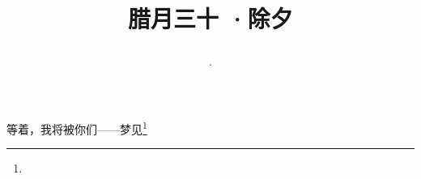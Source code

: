 \title{\date[d=9,m=2,y=2024][year:cn-y,年,month:cn,day:cn,日,·,weekday]·腊月三十 ·除夕}
等着，我将被你们——梦见\footnote{ }

